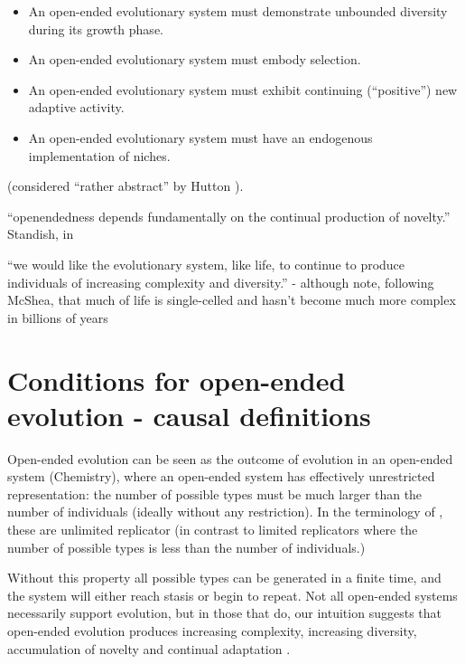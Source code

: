 \begin{itemize}
	\item An open-ended evolutionary system must demonstrate unbounded diversity during its growth phase.
	\item An open-ended evolutionary system must embody selection.
	\item An open-ended evolutionary system must exhibit continuing (``positive'') new adaptive activity.
	\item An open-ended evolutionary system must have an endogenous implementation of niches.
\end{itemize} \cite{Maley1999} (considered ``rather abstract'' by Hutton \parencite[p.341]{Hutton2002}).

``openendedness depends fundamentally on the continual production of novelty.'' Standish, in \parencite{Soros2014}

``we would like the evolutionary system, like life, to continue to produce individuals of increasing complexity and diversity.'' -
although note, following McShea, that much of life is single-celled and hasn't become much more complex in billions of years \parencite{Maley1999}


\section{Conditions for open-ended evolution - causal definitions}

Open-ended evolution can be seen as the outcome of evolution in an open-ended system (\eg Chemistry), where an open-ended system has effectively unrestricted representation: the number of possible types must be much larger than the number of individuals (ideally without any restriction). In the terminology of \cite{Szathmary:2006ty}, these are unlimited replicator (in contrast to limited replicators where the number of possible types is less than the number of individuals.)

Without this property all possible types can be generated in a finite time, and the system will either reach stasis or begin to repeat. Not all open-ended systems necessarily support evolution, but in those that do, our intuition suggests that open-ended evolution produces increasing complexity, increasing diversity, accumulation of novelty and continual adaptation \cite{Lehman2012}.

